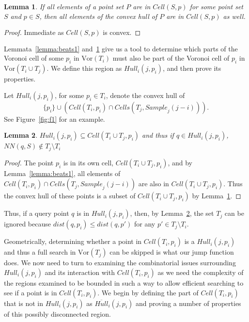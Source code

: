 \documentclass[10pt,a4paper]{amsart}
\newcommand{\Cell}{\mathit{Cell}}
\newcommand{\Cells}{\mathit{Cells}}
\newcommand{\Vor}{\mathrm{Vor}}
\newcommand{\Sample}{\mathit{Sample}}
\newcommand{\Hull}{\mathit{Hull}}
\newcommand{\NN}{\mathit{NN}}
\newtheorem{lemma}{Lemma}
\begin{document}
\begin{lemma} \label{lemma:convex}
    If all elements of a point set $P$ are in $\Cell(S,p)$ for some point set $S$ and $p\in S$, then all elements of the convex hull of $P$ are in  $\Cell(S,p)$ as well.
\end{lemma}

\begin{proof}
    Immediate as $\Cell(S,p)$ is convex.
\end{proof}

Lemmata~\ref{lemma:beats1} and~\ref{lemma:convex} give us a tool to determine which parts of the Voronoi cell of some $p_i$ in $\Vor(T_i)$ must also be part of the Voronoi cell of $p_i$ in $\Vor(T_i \cup T_j)$. We define this region as $\Hull_i(j,p_i)$, and then prove its properties.


Let $\Hull_i(j,p_i)$, for some $p_i \in T_i$,  denote the convex hull of
\[ \{p_i\} \cup ( \Cell(T_i,p_i) \cap   \Cells(T_j,\Sample_j(j-i)) ) .\]
See Figure~\ref{fig:f1} for an example.
\begin{lemma} \label{lemma:hull}
$\Hull_i(j,p_i) \subseteq \Cell(T_i \cup T_j,p_i)$ and thus if $q\in \Hull_i(j,p_i)$, $\NN(q,S) \not \in T_j \setminus T_i$
\end{lemma}
\begin{proof}
The point $p_i$ is in its own cell, $\Cell(T_i \cup T_j,p_i)$, and by Lemma~\ref{lemma:beats1}, 
all elements of $\Cell(T_i,p_i) \cap   \Cells(T_j,\Sample_j(j-i))$
are also in $\Cell(T_i \cup T_j,p_i)$. Thus the convex hull of these points is a subset of 
$\Cell(T_i \cup T_j,p_i)$ by Lemma~\ref{lemma:convex}.
\end{proof}
Thus, if a query point $q$ is in $\Hull_i(j,p_i)$, then, by Lemma~\ref{lemma:hull},  the set $T_j$ can be ignored because $dist(q,p_i)\le dist(q,p')$ for any $p'\in T_j \setminus T_i$.

Geometrically, determining whether a point in $\Cell(T_i,p_i)$ is a $\Hull_i(j,p_i)$ and thus a full search in $\Vor(T_j)$ can be skipped is what our jump function does. We now need to turn to examining the combinatorial issues surrounding $\Hull_i(j,p_i)$ and its interaction with $\Cell(T_i,p_i)$ as we need the complexity of the regions examined to be bounded in such a way to allow efficient searching to see if a point is in $\Cell(T_i,p_i)$. We begin by defining the part of $\Cell(T_i,p_i)$ that is not in $\Hull_i(j,p_i)$ as $\overline{\Hull}_i(j,p_i)$ and proving a number of properties of this possibly disconnected region.
\end{document}
